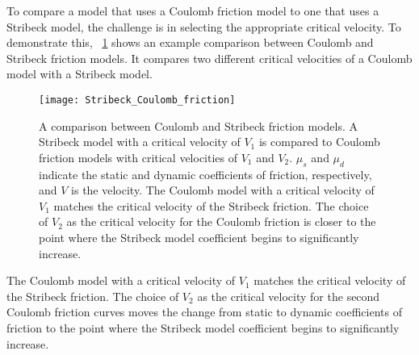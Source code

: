 To compare a model that uses a Coulomb friction model to one that uses a Stribeck model, the challenge is in selecting the appropriate critical velocity.  To demonstrate this, \figurename~\ref{figure:stribeck_coulomb_friction} shows an example comparison between Coulomb and Stribeck friction models. It compares two different critical velocities of a Coulomb model with a Stribeck model.
\begin{figure}
	\centering
	\texttt{[image: Stribeck\_Coulomb\_friction]}
    \caption[Comparison between Coulomb and Stribeck friction model]{A comparison between Coulomb and Stribeck friction models. A Stribeck model with a critical velocity of $V_1$ is compared to Coulomb friction models with critical velocities of $V_1$ and $V_2$. $\mu_s$ and $\mu_d$ indicate the static and dynamic coefficients of friction, respectively, and $V$ is the velocity.  The Coulomb model with a critical velocity of $V_1$ matches the critical velocity of the Stribeck friction.  The choice of $V_2$ as the critical velocity for the Coulomb friction is closer to the point where the Stribeck model coefficient begins to significantly increase.}
	\label{figure:stribeck_coulomb_friction}
\end{figure}
The Coulomb model with a critical velocity of $V_1$ matches the critical velocity of the Stribeck friction.  The choice of $V_2$ as the critical velocity for the second Coulomb friction curves moves the change from static to dynamic coefficients of friction to the point where the Stribeck model coefficient begins to significantly increase.

